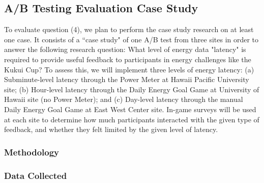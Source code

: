 \documentclass[11pt]{article}
\begin{document}
\subsection{A/B Testing Evaluation Case Study}
To evaluate question (4), we plan to perform the case study research on at least one case. It consists of a ``case study" of one A/B test from three sites in order to answer the following research question: What level of energy data "latency" is required to provide useful feedback to participants in energy challenges like the Kukui Cup?  To assess this, we will implement three levels of energy latency:  (a) Subminute-level latency through the Power Meter at Hawaii Pacific University site; (b) Hour-level latency through the Daily Energy Goal Game at University of Hawaii site (no Power Meter); and (c) Day-level latency through the manual Daily Energy Goal Game at East West Center site.  In-game surveys will  be used at each site to determine how much participants interacted with the given type of feedback, and whether they felt limited by the given level of latency.

\subsubsection{Methodology}

\subsubsection{Data Collected}
  
\end{document}
